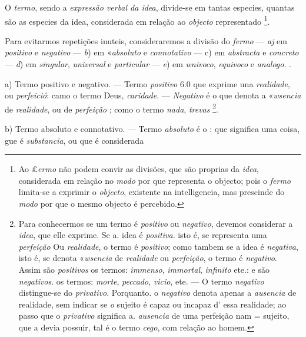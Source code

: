 
 
O \emph{termo}, sendo a \emph{expressão verbal da idea}, divide-se em tantas especies, quantas são as especies da idea, considerada em relação ao \emph{objecto} representado \footnote{Ao £\emph{ermo} não podem convir as divisões, que são proprias da \emph{idea}, considerada em relação no \emph{modo} por que representa o objecto; pois o \emph{fermo} limita-se a exprimir o \emph{objecto}, existente na intelligencia, mas prescinde do \emph{modo} por que o mesmo objecto é percebido.}.

Para evitarmos repetições inuteis, consideraremos a divisão do \emph{fermo} --- \emph{aj} em \emph{positivo} e \emph{negativo} --- \emph{b}) em «\emph{absoluto} e \emph{connotativo} --- c) em \emph{abstracta} e \emph{concreto} --- \emph{d}) em \emph{singular}, \emph{universal} e \emph{particular} --- \emph{e}) em \emph{wnivoco}, \emph{equivoco} e \emph{analogo}. .

a) Termo positivo e negativo. --- Termo \emph{positivo} 6.0 que exprime una \emph{realidade}, ou \emph{perfeició}: camo o termo Deus, \emph{caridade}. --- \emph{Negativo} é o que denota a «\emph{wsencia} de \emph{realidade}, ou de \emph{perfeição} ; como o termo \emph{nada}, \emph{trevas} \footnote{Para conhecermos se um termo é \emph{positivo} ou \emph{negativo}, devemos considerar a \emph{idea}, que elle exprime. Se a. idea é \emph{positiva}. isto é, se representa uma \emph{perfeição} Ou \emph{realidade}, o termo é \emph{positivo}; como tambem se a idea é \emph{negativa}, isto é, se denota «\emph{wsencia} de \emph{realidade} ou \emph{perfeição}, o termo é \emph{negativo}. Assim são \emph{positivos} os termos: \emph{immenso}, \emph{immortal}, \emph{infinito} ete.: e são \emph{negativos}. os termos: \emph{morte}, \emph{peccado}, \emph{vicio}, ete. --- O termo \emph{negativo} distingue-se do \emph{privativo}. Porquanto. o \emph{negativo} denota apenas a \emph{ausencia} de realidade, sem indicar se \emph{o} sujeito é capaz ou incapaz d' essa realidade; ao passo que o \emph{privativo} significa a. \emph{ausencia} de uma perfeição nam = sujeito, que a devia possuir, tal é o termo \emph{cego}, com relação ao homem.}.

b) Termo absoluto e connotativo. --- Termo \emph{absoluto} é o : que significa uma coisa, gue é \emph{substancia}, ou que é considerada

